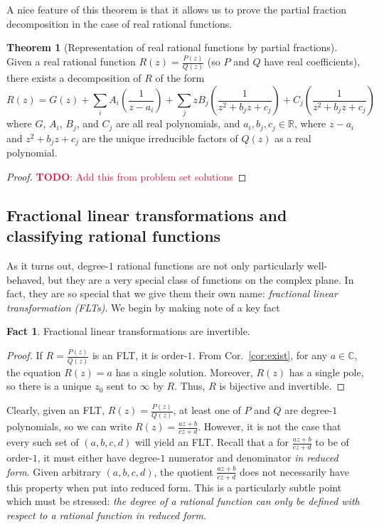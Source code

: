 \documentclass[aps,pra,showpacs,notitlepage,onecolumn,superscriptaddress,nofootinbib]{revtex4-1}
\newcommand{\pop}[1]{\textcolor{crimson}{#1}}
\theoremstyle{definition}
\newtheorem{theorem}{Theorem}[section]
\newtheorem{fact}{Fact}[section]
\begin{document}
\noindent A nice feature of this theorem is that it allows us to prove the partial fraction decomposition in the case of real rational functions.

\begin{theorem}[Representation of real rational functions by partial fractions]
  Given a real rational function $R(z) = \frac{P(z)}{Q(z)}$ (so $P$ and $Q$ have real coefficients), there exists a decomposition of $R$ of the form
  \begin{equation}
    \label{eq:r_decomp}
    R(z) = G(z) + \displaystyle\sum_{i} A_i \left( \frac{1}{z - a_i} \right) + \displaystyle\sum_{j} z B_j \left( \frac{1}{z^2 + b_j z + c_j} \right) + C_j \left( \frac{1}{z^2 + b_j z + c_j} \right)
  \end{equation}
  where $G$, $A_i$, $B_j$, and $C_j$ are all real polynomials, and $a_i, b_j, c_j \in \mathbb{R}$, where $z - a_i$ and $z^2 + b_j z + c_j$ are the unique irreducible factors of $Q(z)$ as a real polynomial.
\end{theorem}

\begin{proof}
  \pop{\textbf{TODO}: Add this from problem set solutions}
  \end{proof}

\subsection{Fractional linear transformations and classifying rational functions}

\noindent As it turns out, degree-$1$ rational functions are not only particularly well-behaved, but they are a very special class of functions on the complex plane. In fact, they are
so special that we give them their own name: \emph{fractional linear transformation (FLTs)}. We begin by making note of a key fact

\begin{fact}
  Fractional linear transformations are invertible.
\end{fact}
\begin{proof}
  If $R = \frac{P(z)}{Q(z)}$ is an FLT, it is order-$1$. From Cor.~\ref{cor:exist}, for any $a \in \mathbb{C}$, the equation $R(z) = a$ has a single solution. Moreover, $R(z)$ has a single pole, so there is a unique $z_0$ sent to $\infty$
  by $R$. Thus, $R$ is bijective and invertible.
\end{proof}

\noindent Clearly, given an FLT, $R(z) = \frac{P(z)}{Q(z)}$, at least one of $P$ and $Q$ are degree-$1$ polynomials, so we can write $R(z) = \frac{az + b}{cz + d}$. However, it is not the case that every such set of $(a, b, c, d)$ will yield an FLT. Recall
that a for $\frac{az + b}{cz + d}$ to be of order-$1$, it must either have degree-$1$ numerator and denominator \emph{in reduced form}. Given arbitrary $(a, b, c, d)$, the quotient $\frac{az + b}{cz + d}$ does not necessarily have this property
when put into reduced form. This is a particularly subtle point which must be stressed: \emph{the degree of a rational function can only be defined with respect to a rational function in reduced form}.
\end{document}
